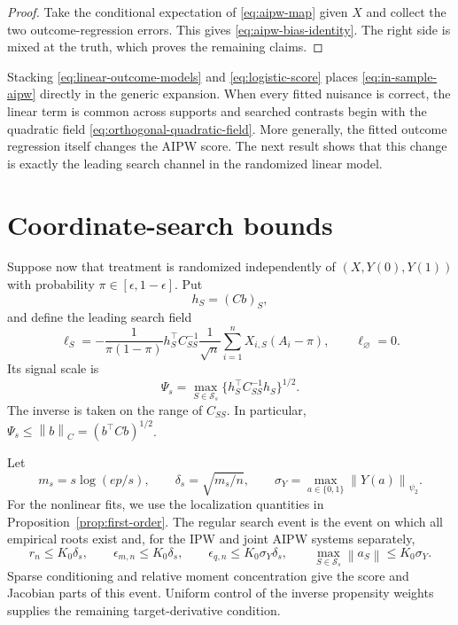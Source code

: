 \documentclass[a4paper,10pt,english]{article}
\newcommand{\norm}[1]{\left\lVert #1\right\rVert}
\begin{document}
\begin{proof}
Take the conditional expectation of \eqref{eq:aipw-map} given $X$ and
collect the two outcome-regression errors.  This gives
\eqref{eq:aipw-bias-identity}.  The right side is mixed at the truth, which
proves the remaining claims.
\end{proof}

Stacking \eqref{eq:linear-outcome-models} and
\eqref{eq:logistic-score} places \eqref{eq:in-sample-aipw} directly in the
generic expansion.  When every fitted nuisance is correct, the linear term
is common across supports and searched contrasts begin with the quadratic
field \eqref{eq:orthogonal-quadratic-field}.  More generally, the fitted
outcome regression itself changes the AIPW score.  The next result shows
that this change is exactly the leading search channel in the randomized
linear model.

\section{Coordinate-search bounds}

Suppose now that treatment is randomized independently of
$(X,Y(0),Y(1))$ with probability
$\pi\in[\epsilon,1-\epsilon]$.  Put
\begin{equation}\label{eq:outcome-signal}
 h_S=(Cb)_S,
\end{equation}
and define the leading search field
\begin{equation}\label{eq:common-leading-field}
 \ell_S=-\frac{1}{\pi(1-\pi)}
 h_S^\top C_{SS}^{-1}
 \frac1{\sqrt n}\sum_{i=1}^nX_{i,S}(A_i-\pi),
 \qquad \ell_\varnothing=0.
\end{equation}
Its signal scale is
\begin{equation}\label{eq:sparse-signal}
 \Psi_s=\max_{S\in\mathcal S_s}
 \{h_S^\top C_{SS}^{-1}h_S\}^{1/2}.
\end{equation}
The inverse is taken on the range of $C_{SS}$.  In particular,
$\Psi_s\le\norm{b}_C=(b^\top Cb)^{1/2}$.

Let
\begin{equation*}
 m_s=s\log(ep/s),
 \qquad
 \delta_s=\sqrt{m_s/n},
 \qquad
 \sigma_Y=\max_{a\in\{0,1\}}
 \norm{Y(a)}_{\psi_2}.
\end{equation*}
For the nonlinear fits, we use the localization quantities in
Proposition~\ref{prop:first-order}.  The regular search event is the event
on which all empirical roots exist and, for the IPW and joint AIPW systems
separately,
\begin{equation}\label{eq:regular-search-event}
 r_n\le K_0\delta_s,
 \qquad
 \epsilon_{m,n}\le K_0\delta_s,
 \qquad
 \epsilon_{q,n}\le K_0\sigma_Y\delta_s,
 \qquad
 \max_{S\in\mathcal S_s}\norm{a_S}\le K_0\sigma_Y.
\end{equation}
Sparse conditioning and relative moment concentration give the score and
Jacobian parts of this event.  Uniform control of the inverse propensity
weights supplies the remaining target-derivative condition.
\end{document}

